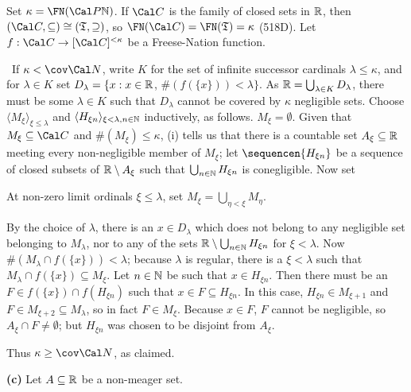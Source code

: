 {\medskip

 Set $\kappa=\FN(\Cal P\Bbb N)$.   If $\Cal C$ is the
family of closed sets in $\Bbb R$, then
$(\Cal C,\subseteq)\cong(\frak T,\supseteq)$, so
$\FN(\Cal C)=\FN(\frak T)=\kappa$ (518D).
Let $f:\Cal C\to[\Cal C]^{<\kappa}$ be a
Freese-Nation function.

\medskip

 \Quer\ If $\kappa<\cov\Cal N$, write $K$ for the set of
infinite successor cardinals $\lambda\le\kappa$, and for
$\lambda\in K$ set
$D_{\lambda}=\{x:x\in\Bbb R$, $\#(f(\{x\}))<\lambda\}$.   As
$\Bbb R=\bigcup_{\lambda\in K}D_{\lambda}$, there must be
some $\lambda\in K$ such that $D_{\lambda}$ cannot be covered
by $\kappa$ negligible sets.   Choose
$\langle M_{\xi}\rangle_{\xi\le\lambda}$ and
$\langle H_{\xi n}\rangle_{\xi<\lambda,n\in\Bbb N}$ inductively, as
follows.   $M_{\xi}=\emptyset$.   Given that $M_{\xi}\subseteq\Cal C$
and $\#(M_{\xi})\le\kappa$, (i)
tells us that there is a countable set $A_{\xi}\subseteq\Bbb R$
meeting every non-negligible member of $M_{\xi}$;  let
$\sequencen{H_{\xi n}}$ be a sequence of closed subsets of
$\Bbb R\setminus A_{\xi}$ such that $\bigcup_{n\in\Bbb N}H_{\xi n}$ is
conegligible.   Now set


\noindent At non-zero limit ordinals $\xi\le\lambda$, set
$M_{\xi}=\bigcup_{\eta<\xi}M_{\eta}$.

By the choice of $\lambda$, there is an $x\in D_{\lambda}$ which does not
belong to any negligible set belonging to $M_{\lambda}$,
nor to any of the sets
$\Bbb R\setminus\bigcup_{n\in\Bbb N}H_{\xi n}$ for $\xi<\lambda$.   Now
$\#(M_{\lambda}\cap f(\{x\}))<\lambda$;  because $\lambda$ is regular,
there is a $\xi<\lambda$ such that
$M_{\lambda}\cap f(\{x\})\subseteq M_{\xi}$.
Let $n\in\Bbb N$ be such that $x\in H_{\xi n}$.   Then there must be an
$F\in f(\{x\})\cap f(H_{\xi n})$ such that $x\in F\subseteq H_{\xi n}$.
In this case, $H_{\xi n}\in M_{\xi+1}$ and
$F\in M_{\xi+2}\subseteq M_{\lambda}$, so in fact
$F\in M_{\xi}$.   Because $x\in F$, $F$ cannot be negligible, so
$A_{\xi}\cap F\ne\emptyset$;  but $H_{\xi n}$ was chosen to be disjoint
from $A_{\xi}$.\ \Bang

\medskip

 Thus $\kappa\ge\cov\Cal N$, as claimed.
\medskip

{\bf (c)} Let $A\subseteq\Bbb R$ be a non-meager set.

}
